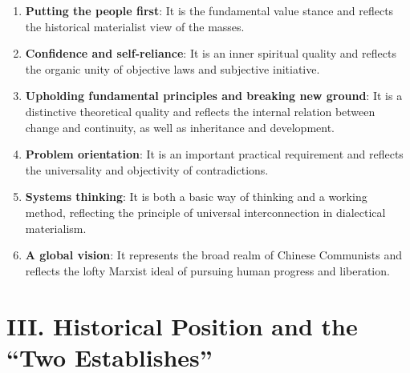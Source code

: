 \documentclass[11pt,a4paper]{ctexart}
\begin{document}
\begin{enumerate}[leftmargin=2em]
    \item \textbf{Putting the people first}: It is the fundamental value stance and reflects the historical materialist view of the masses.
    \item \textbf{Confidence and self-reliance}: It is an inner spiritual quality and reflects the organic unity of objective laws and subjective initiative.
    \item \textbf{Upholding fundamental principles and breaking new ground}: It is a distinctive theoretical quality and reflects the internal relation between change and continuity, as well as inheritance and development.
    \item \textbf{Problem orientation}: It is an important practical requirement and reflects the universality and objectivity of contradictions.
    \item \textbf{Systems thinking}: It is both a basic way of thinking and a working method, reflecting the principle of universal interconnection in dialectical materialism.
    \item \textbf{A global vision}: It represents the broad realm of Chinese Communists and reflects the lofty Marxist ideal of pursuing human progress and liberation.
\end{enumerate}

\section{III. Historical Position and the ``Two Establishes''}
\end{document}
